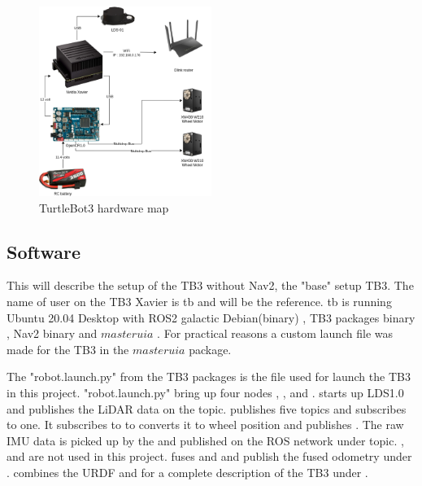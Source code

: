 \begin{figure}[H]
    \centering
    \includegraphics[width = 0.5\textwidth]{Figures/drawio/TB_HW.drawio.png}
    \caption{TurtleBot3 hardware map}
    \label{fig:TB3Hardware}
\end{figure}

\subsection{Software}

This will describe the setup of the TB3 without Nav2, the "base" setup TB3.  
The name of user on the TB3 Xavier is tb and will be the reference. tb is running Ubuntu 20.04 Desktop \cite{ubuntu20_04} with ROS2 galactic Debian(binary) \cite{rosgalacticinstall}, TB3 packages binary \cite{turtlebot3galactic}, Nav2 binary \cite{rosnavinstall} and $masteruia$ \cite{masteruia}. For practical reasons a custom launch file was made for the TB3 in the $masteruia$ package. 

The "robot.launch.py" from the TB3 packages is the file used for launch the TB3 in this project. "robot.launch.py" bring up four nodes , ,  and . 
 starts up LDS1.0 and publishes the LiDAR data on the  topic.  publishes five topics and subscribes to one. It subscribes to to  converts it to wheel position and publishes . The raw IMU data is picked up by the  and published on the ROS network under  topic. ,  and  are not used in this project. 
 fuses  and  and publish the fused odometry under . 
 combines the URDF and  for a complete description of the TB3 under .

